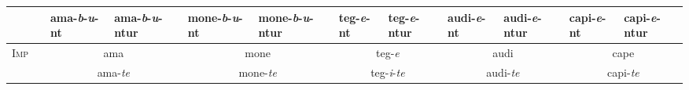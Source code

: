 \documentclass[12pt,a4paper]{article}
\begin{document}
{{\begin{tabular}{ c | c | l l | l l | l l | l l | l l }
 & & ama-\emph{b}-\emph{u}-nt  & ama-\emph{b}-\emph{u}-ntur & mone-\emph{b}-\emph{u}-nt  & mone-\emph{b}-\emph{u}-ntur & teg-\emph{e}-nt  & teg-\emph{e}-ntur & audi-\emph{e}-nt  & audi-\emph{e}-ntur & capi-\emph{e}-nt  & capi-\emph{e}-ntur \\
\midrule
\multirow{2}{*}{\textsc{Imp}} & & \multicolumn{2}{c|}{ama}           & \multicolumn{2}{c|}{mone}           & \multicolumn{2}{c|}{teg-\emph{e}}           & \multicolumn{2}{c|}{audi} & \multicolumn{2}{c}{cape} \\
                              & & \multicolumn{2}{c|}{ama-\emph{te}} & \multicolumn{2}{c|}{mone-\emph{te}} & \multicolumn{2}{c|}{teg-\emph{i}-\emph{te}} & \multicolumn{2}{c|}{audi-\emph{te}} & \multicolumn{2}{c}{capi-\emph{te}} \\
\bottomrule
\end{tabular}}}
\end{document}
